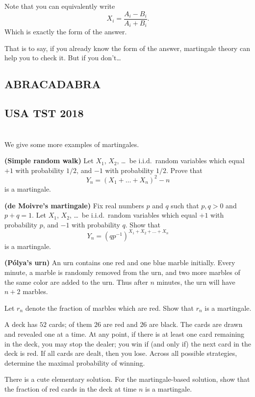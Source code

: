 \begin{remark}
	Note that you can equivalently write
	\[ X_i = \frac{A_i-B_i}{A_i+B_i}. \]
	Which is exactly the form of the answer.

	That is to say, if you already know the form of the answer, martingale theory can help you to
	check it. But if you don't\dots
\end{remark}

\subsection{ABRACADABRA}


\subsection{USA TST 2018}

\section{\problemhead}

\begin{problem}
	\label{exer:martingale}
	We give some more examples of martingales.
	\begin{enumerate}[(a)]
		\ii \textbf{(Simple random walk)}
		Let $X_1$, $X_2$, \dots\ be i.i.d.\ random variables
		which equal $+1$ with probability $1/2$,
		and $-1$ with probability $1/2$.
		Prove that
		\[ Y_n = \left( X_1 + \dots + X_n \right)^2 - n \]
		is a martingale.

		\ii \textbf{(de Moivre's martingale)}
		Fix real numbers $p$ and $q$ such that $p,q > 0$ and $p+q=1$.
		Let $X_1$, $X_2$, \dots\ be i.i.d.\ random variables
		which equal $+1$ with probability $p$,
		and $-1$ with probability $q$.
		Show that
		\[ Y_n = \left(qp^{-1}\right)^{X_1 + X_2 + \dots + X_n} \]
		is a martingale.

		\ii \textbf{(P\'{o}lya's urn)}
		An urn contains one red and one blue marble initially.
		Every minute, a marble is randomly removed from the urn,
		and two more marbles of the same color are added to the urn.
		Thus after $n$ minutes, the urn will have $n+2$ marbles.

		Let $r_n$ denote the fraction of marbles which are red.
		Show that $r_n$ is a martingale.
	\end{enumerate}
\end{problem}

\begin{problem}
	A deck has $52$ cards; of them $26$ are red and $26$ are black.
	The cards are drawn and revealed one at a time.
	At any point, if there is at least one card remaining in the deck,
	you may stop the dealer;
	you win if (and only if) the next card in the deck is red.
	If all cards are dealt, then you lose.
	Across all possible strategies,
	determine the maximal probability of winning.
	\begin{hint}
		There is a cute elementary solution.
		For the martingale-based solution,
		show that the fraction of red cards in the deck at time $n$ is a martingale.
	\end{hint}
\end{problem}

